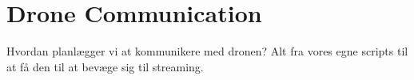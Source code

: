 \chapter{Drone Communication}

Hvordan planlægger vi at kommunikere med dronen? Alt fra vores egne scripts til at få den til at bevæge sig til streaming. 
